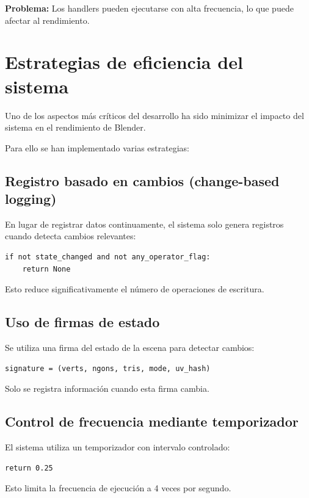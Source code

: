 \textbf{Problema:}
Los handlers pueden ejecutarse con alta frecuencia, lo que puede afectar al rendimiento.

\section{Estrategias de eficiencia del sistema}

Uno de los aspectos más críticos del desarrollo ha sido minimizar el impacto del sistema en el rendimiento de Blender.

Para ello se han implementado varias estrategias:

\subsection{Registro basado en cambios (change-based logging)}

En lugar de registrar datos continuamente, el sistema solo genera registros cuando detecta cambios relevantes:

\begin{verbatim}
if not state_changed and not any_operator_flag:
    return None
\end{verbatim}

Esto reduce significativamente el número de operaciones de escritura.

\subsection{Uso de firmas de estado}

Se utiliza una firma del estado de la escena para detectar cambios:

\begin{verbatim}
signature = (verts, ngons, tris, mode, uv_hash)
\end{verbatim}

Solo se registra información cuando esta firma cambia.

\subsection{Control de frecuencia mediante temporizador}

El sistema utiliza un temporizador con intervalo controlado:

\begin{verbatim}
return 0.25
\end{verbatim}

Esto limita la frecuencia de ejecución a 4 veces por segundo.

